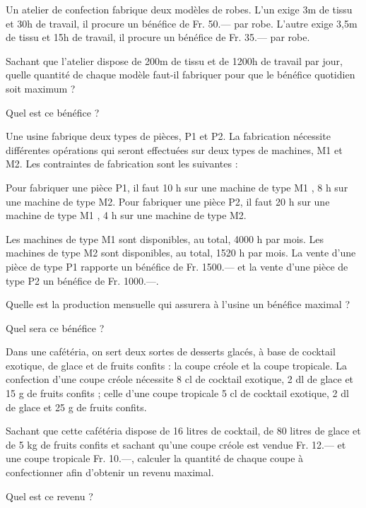 \begin{exercice}
Un atelier de confection fabrique deux modèles de robes. L’un exige 3m de tissu et 30h de travail, il procure un bénéfice de Fr. 50.— par robe. L’autre exige 3,5m de tissu et 15h de travail, il procure un bénéfice de Fr. 35.— par robe. 

Sachant que l’atelier dispose de 200m de tissu et de 1200h de travail par jour, quelle quantité de chaque modèle faut-il fabriquer pour que le bénéfice quotidien soit maximum ?

Quel est ce bénéfice ?
\end{exercice}

\begin{exercice}
Une usine fabrique deux types de pièces, P1 et P2. La fabrication nécessite différentes opérations qui seront effectuées sur deux types de machines, M1 et M2. 
Les contraintes de fabrication sont les suivantes :
		
Pour fabriquer une pièce P1, il faut 10 h sur une machine de type M1 , 8 h sur une machine de type M2.
Pour fabriquer une pièce P2, il faut 20 h sur une machine de type M1 , 4 h sur une machine de type M2.

Les machines de type M1 sont disponibles, au total, 4000 h par mois. Les machines de type M2 sont disponibles, au total, 1520 h par mois.
La vente d’une pièce de type P1 rapporte un bénéfice de Fr. 1500.— et la vente d’une pièce de type P2 un bénéfice de Fr. 1000.—.

Quelle est la production mensuelle qui assurera à l’usine un bénéfice maximal ?

Quel sera ce bénéfice ?
\end{exercice}

\begin{exercice}
Dans une cafétéria, on sert deux sortes de desserts glacés, à base de cocktail exotique, de glace et de fruits confits : la coupe créole et la coupe tropicale.
La confection d’une coupe créole nécessite 8 cl de cocktail exotique, 2 dl de glace et 15 g de fruits confits ; celle d’une coupe tropicale 5 cl de cocktail exotique, 2 dl de glace et 25 g de fruits confits.

Sachant que cette cafétéria dispose de 16 litres de cocktail, de 80 litres de glace et de 5 kg de fruits confits et sachant qu’une coupe créole est vendue Fr. 12.— et une coupe tropicale Fr. 10.—, calculer la quantité de chaque coupe à confectionner afin d’obtenir un revenu maximal. 

Quel est ce revenu ?
\end{exercice}

